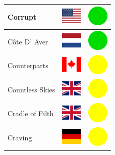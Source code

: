 \documentclass[12pt, a4paper, twoside]{report}
\begin{document}
\begin{center}
\begin{longtable}{|p{5cm}|p{2cm}|p{2cm}|}
 Corrupt                                                    & \includegraphics[width=1cm]{../4x3/us} &   \includegraphics[width=1cm]{../likes/y} \\ \hline
 Côte D' Aver                                               & \includegraphics[width=1cm]{../4x3/nl} &   \includegraphics[width=1cm]{../likes/y} \\ \hline
 Counterparts                                               & \includegraphics[width=1cm]{../4x3/ca} &   \includegraphics[width=1cm]{../likes/m} \\ \hline
 Countless Skies                                            & \includegraphics[width=1cm]{../4x3/gb} &   \includegraphics[width=1cm]{../likes/m} \\ \hline
 Cradle of Filth                                            & \includegraphics[width=1cm]{../4x3/gb} &   \includegraphics[width=1cm]{../likes/m} \\ \hline
 Craving                                                    & \includegraphics[width=1cm]{../4x3/de} &   \includegraphics[width=1cm]{../likes/m} \\ \hline

\end{longtable}
\end{center}
\end{document}
